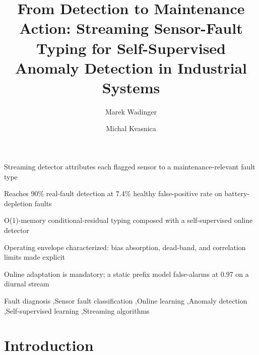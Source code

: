 \documentclass[preprint,12pt,authoryear]{elsarticle}
\begin{document}
\begin{frontmatter}

    \title{From Detection to Maintenance Action: Streaming Sensor-Fault Typing for Self-Supervised Anomaly Detection in Industrial Systems}

    \author[aff1]{Marek Wadinger}

    \author[aff1]{Michal Kvasnica}


    \begin{abstract}
        
    \end{abstract}

    \begin{highlights}
        \item Streaming detector attributes each flagged sensor to a maintenance-relevant fault type
        \item Reaches 90\% real-fault detection at 7.4\% healthy false-positive rate on battery-depletion faults
        \item O(1)-memory conditional-residual typing composed with a self-supervised online detector
        \item Operating envelope characterized: bias absorption, dead-band, and correlation limits made explicit
        \item Online adaptation is mandatory; a static prefix model false-alarms at 0.97 on a diurnal stream
    \end{highlights}

    \begin{keyword}
        Fault diagnosis \sep Sensor fault classification \sep Online learning \sep Anomaly detection \sep Self-supervised learning \sep Streaming algorithms
    \end{keyword}

\end{frontmatter}

\linenumbers

\section{Introduction}
\label{Introduction}

\end{document}
